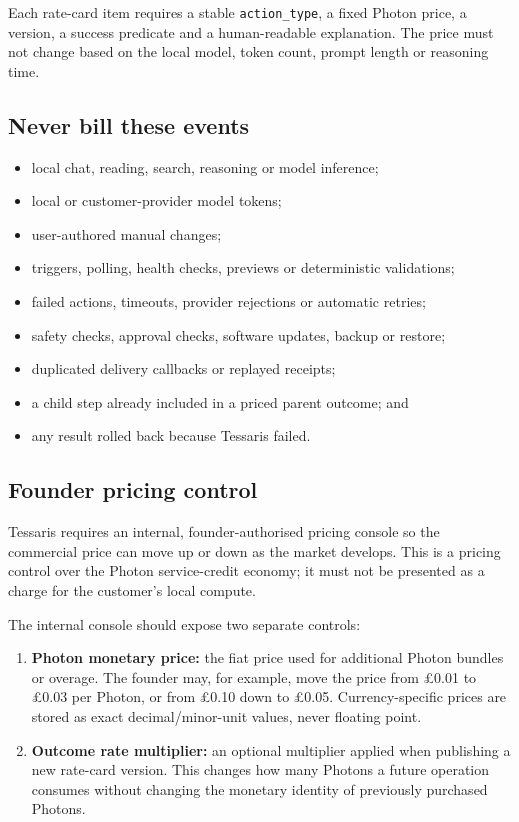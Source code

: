 \documentclass[11pt]{article}
\newcommand{\code}[1]{\texttt{#1}}
\begin{document}
Each rate-card item requires a stable \code{action\_type}, a fixed Photon price, a version, a success predicate and a human-readable explanation. The price must not change based on the local model, token count, prompt length or reasoning time.

\subsection{Never bill these events}

\begin{itemize}
  \item local chat, reading, search, reasoning or model inference;
  \item local or customer-provider model tokens;
  \item user-authored manual changes;
  \item triggers, polling, health checks, previews or deterministic validations;
  \item failed actions, timeouts, provider rejections or automatic retries;
  \item safety checks, approval checks, software updates, backup or restore;
  \item duplicated delivery callbacks or replayed receipts;
  \item a child step already included in a priced parent outcome; and
  \item any result rolled back because Tessaris failed.
\end{itemize}

\subsection{Founder pricing control}

Tessaris requires an internal, founder-authorised pricing console so the commercial price can move up or down as the market develops. This is a pricing control over the Photon service-credit economy; it must not be presented as a charge for the customer's local compute.

The internal console should expose two separate controls:

\begin{enumerate}
  \item \textbf{Photon monetary price:} the fiat price used for additional Photon bundles or overage. The founder may, for example, move the price from \pounds 0.01 to \pounds 0.03 per Photon, or from \pounds 0.10 down to \pounds 0.05. Currency-specific prices are stored as exact decimal/minor-unit values, never floating point.
  \item \textbf{Outcome rate multiplier:} an optional multiplier applied when publishing a new rate-card version. This changes how many Photons a future operation consumes without changing the monetary identity of previously purchased Photons.
\end{enumerate}
\end{document}
